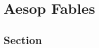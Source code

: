 \documentclass[11pt,a4paper]{article}
\begin{document}
\chapter{Aesop Fables}
\section*{Section}
\end{document}
